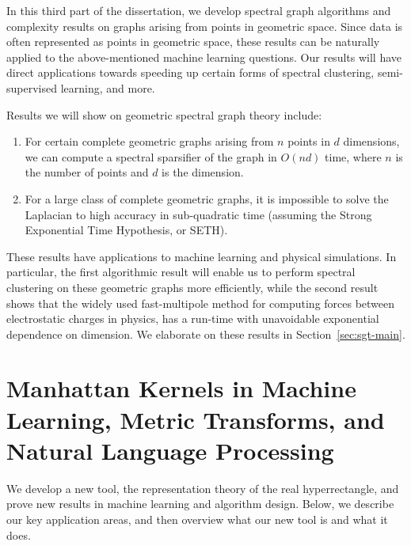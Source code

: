  In this third part of the dissertation, we develop spectral graph
  algorithms and complexity results on graphs arising from points in geometric space. Since
  data is often represented as points in geometric space, these
  results can be naturally applied to the above-mentioned machine
  learning questions. Our results will have direct applications towards
  speeding up certain forms of spectral clustering, semi-supervised
  learning, and more.

  Results we will show on geometric spectral graph theory include: 
  \begin{enumerate}
  \item For certain complete geometric graphs arising from $n$ points in
  $d$ dimensions, we can compute a spectral
  sparsifier of the graph in $O(nd)$ time, where $n$ is the number of
  points and $d$ is the dimension.
  \item  For a large class of complete geometric graphs, it is
  impossible to solve the Laplacian to high accuracy in sub-quadratic
  time (assuming the Strong Exponential Time Hypothesis, or SETH).
  \end{enumerate}
  These results have applications to machine learning and physical
  simulations. In particular, the first algorithmic result will enable us to perform
  spectral clustering on these geometric graphs more efficiently, while
  the second result shows that the widely used fast-multipole method for
  computing forces between electrostatic charges in physics, has a
  run-time with unavoidable exponential dependence on dimension. We
  elaborate on these results in Section~\ref{sec:sgt-main}.
  

\iffalse
\section{Manhattan Kernels in Machine Learning, Metric Transforms, and Natural
  Language Processing}
      We develop a new tool, the representation theory of the real
      hyperrectangle, and prove new results in machine learning and algorithm design. Below, we describe our key application
      areas, and then overview what our new tool is and what it does.
